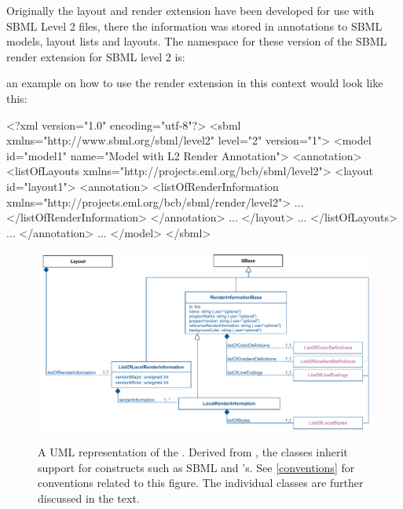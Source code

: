 Originally the layout and render extension have been developed for use with SBML Level 2 files, there the information was stored in annotations to SBML models, layout lists and layouts.
The namespace for these version of the SBML render extension for SBML level 2 is: 

\begin{center}
\end{center}

an example on how to use the render extension in this context would look like this: 

\begin{example}
<?xml version="1.0" encoding="utf-8"?>
<sbml xmlns="http://www.sbml.org/sbml/level2" level="2" version="1">
  <model id="model1" name="Model with L2 Render Annotation">
    <annotation>
      <listOfLayouts xmlns="http://projects.eml.org/bcb/sbml/level2">
        <layout id="layout1">
          <annotation>
            <listOfRenderInformation xmlns="http://projects.eml.org/bcb/sbml/render/level2">
							...
            </listOfRenderInformation>
          </annotation>
					...
        </layout>
				...
      </listOfLayouts>
			...
    </annotation>
		...
  </model>
</sbml>
\end{example}


\begin{figure}[h!]
  \centering
  \includegraphics[width=\textwidth]{images/render-layout-uml}\\
  \caption{A UML representation of the \RenderPackage. Derived from \SBase, the \Render classes inherit support for constructs such as SBML \Notes and \Annotation's. See \ref{conventions} for conventions related to this figure. The individual classes are further discussed in the text.}
  \label{fig:Render_uml}
\end{figure}

